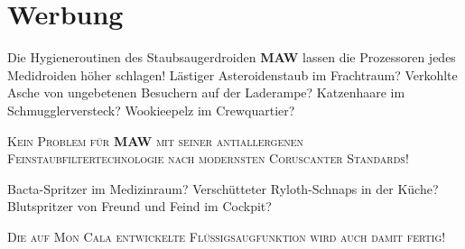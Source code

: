 \documentclass[final]{multiversum}
\begin{document}
\section{Werbung}


Die Hygieneroutinen des Staubsaugerdroiden \textbf{MAW} lassen die Prozessoren jedes Medidroiden höher schlagen!
Lästiger Asteroidenstaub im Frachtraum?
Verkohlte Asche von ungebetenen Besuchern auf der Laderampe?
Katzenhaare im Schmugglerversteck? Wookieepelz im Crewquartier?\\
\begin{center}\textsc{Kein Problem für \textbf{MAW} mit seiner antiallergenen Feinstaubfiltertechnologie nach modernsten Coruscanter Standards!}\\\end{center}
Bacta-Spritzer im Medizinraum?
Verschütteter Ryloth-Schnaps in der Küche?
Blutspritzer von Freund und Feind im Cockpit?\\
\begin{center}\textsc{Die auf Mon Cala entwickelte Flüssigsaugfunktion wird auch damit fertig!}\\\end{center}
\end{document}
